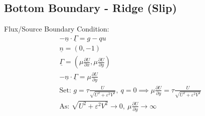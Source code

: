 \documentclass[letterpaper,landscape, 10pt]{article}
\renewcommand{\vec}[1]{\underline{#1}}
\newcommand{\pd}[2]{\frac{\partial #1}{\partial #2}}
\begin{document}
	\subsection{Bottom Boundary - Ridge (Slip)}
	Flux/Source Boundary Condition:
	\begin{gather*}
		-\vec{n}\cdot\vec{\Gamma} = g-qu\\
		\vec{n} = \left(0,-1\right)\\
		\vec{\Gamma} = \left(\mu\pd{U}{x},\mu\pd{U}{y}\right)\\
		-\vec{n}\cdot\vec{\Gamma} = \mu\pd{U}{y}\\
		\text{Set: }g = \tau\frac{U}{\sqrt{U^2+\varepsilon^2V^2}},\ q = 0 \implies \mu\pd{U}{y} = \tau\frac{U}{\sqrt{U^2+\varepsilon^2V^2}}\\
		\text{As: }\sqrt{U^2+\varepsilon^2V^2}\rightarrow 0,\ \mu\pd{U}{y} \rightarrow \infty
	\end{gather*}
	
\end{document}
